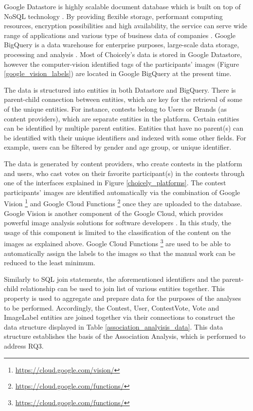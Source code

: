     Google Datastore is highly scalable document database which is built on top of NoSQL technology \cite{google-datastore-overview}. By providing flexible storage, performant computing resources, encryption possibilities and high availability, the service can serve wide range of applications and various type of business data of companies \cite{google-datastore-overview}. Google BigQuery is a data warehouse for enterprise purposes, large-scale data storage, processing and analysis \cite{google-bigquery-overview}. Most of Choicely's data is stored in Google Datastore, however the computer-vision identified tags of the participants' images (Figure \ref{google_vision_labels}) are located in Google BigQuery at the present time.
    
    The data is structured into entities in both Datastore and BigQuery. There is parent-child connection between entities, which are key for the retrieval of some of the unique entities. For instance, contests belong to Users or Brands (as content providers), which are separate entities in the platform. Certain entities can be identified by multiple parent entities. Entities that have no parent(s) can be identified with their unique identifiers and indexed with some other fields. For example, users can be filtered by gender and age group, or unique identifier. 
    
    The data is generated by content providers, who create contests in the platform and users, who cast votes on their favorite participant(s) in the contests through one of the interfaces explained in Figure \ref{choicely_platforms}. The contest participants' images are identified automatically via the combination of Google Vision \footnote{\url{https://cloud.google.com/vision/}} and Google Cloud Functions \footnote{\url{https://cloud.google.com/functions/}} once they are uploaded to the database. Google Vision is another component of the Google Cloud, which provides powerful image analysis solutions for software developers \cite{google-vision-overview}. In this study, the usage of this component is limited to the classification of the content on the images as explained above.  Google Cloud Functions \footnote{\url{https://cloud.google.com/functions/}} are used to be able to automatically assign the labels to the images so that the manual work can be reduced to the least minimum. 

    Similarly to SQL join statements, the aforementioned identifiers and the parent-child relationship can be used to join list of various entities together. This property is used to aggregate and prepare data for the purposes of the analyses to be performed. Accordingly, the Contest, User, ContestVote, Vote and ImageLabel entities are joined together via their connections to construct the data structure displayed in Table \ref{association_analyisis_data}. This data structure establishes the basis of the Association Analysis, which is performed to address RQ3. 

